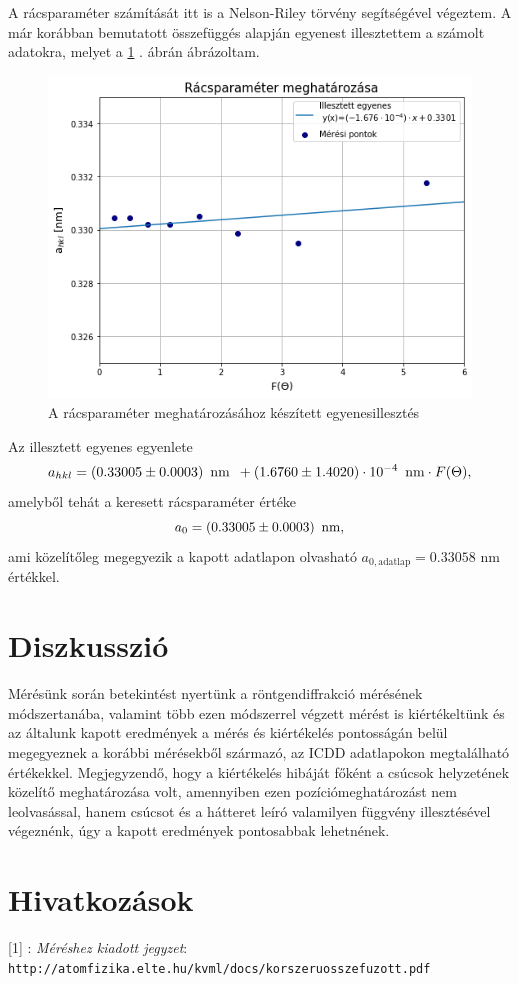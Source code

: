 \documentclass[12pt,a4paper]{article}
\begin{document}
\newpage
A rácsparaméter számítását itt is a Nelson-Riley törvény segítségével végeztem. A már korábban bemutatott összefüggés alapján egyenest illesztettem a számolt adatokra, melyet a \ref{fig:7} . ábrán ábrázoltam. \\
\begin{figure}[!h]
\hspace*{-0.5cm}
\includegraphics[scale=0.75]{ta}
\caption{A rácsparaméter meghatározásához készített egyenesillesztés}
\label{fig:7}
\end{figure}
\newline
Az illesztett egyenes egyenlete
$$ a_{hkl} = (0.33005 \pm 0.0003) \hspace*{5pt} \mathrm{nm} \hspace*{5pt} + (1.6760 \pm 1.4020)\cdot 10^{-4} \hspace*{5pt} \mathrm{nm} \cdot F(\Theta),$$
amelyből tehát a keresett rácsparaméter értéke 
$$a_0=(0.33005 \pm 0.0003) \hspace*{5pt} \mathrm{nm},$$
ami közelítőleg megegyezik a kapott adatlapon olvasható $a_{0,\textrm{adatlap}}=0.33058$ nm értékkel.
\newpage
\section{Diszkusszió}
\hspace*{10pt} Mérésünk során betekintést nyertünk a röntgendiffrakció mérésének módszertanába, valamint több ezen módszerrel végzett mérést is kiértékeltünk és az általunk kapott eredmények a mérés és kiértékelés pontosságán belül megegyeznek a korábbi mérésekből származó, az ICDD adatlapokon megtalálható értékekkel. Megjegyzendő, hogy a kiértékelés hibáját főként a csúcsok helyzetének közelítő meghatározása volt, amennyiben ezen pozíciómeghatározást nem leolvasással, hanem csúcsot és a hátteret leíró valamilyen függvény illesztésével végeznénk, úgy a kapott eredmények pontosabbak lehetnének.

\section*{Hivatkozások}
\hspace*{14pt} [1] : \emph{Méréshez kiadott jegyzet}:\\
\hspace*{34pt} \texttt{http://atomfizika.elte.hu/kvml/docs/korszeruosszefuzott.pdf}\\
\end{document}
